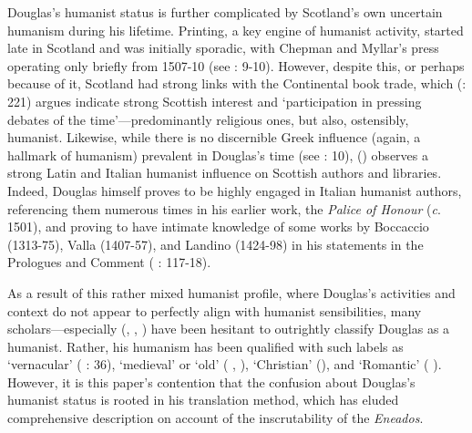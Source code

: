 \documentclass{dhbenelux}
\begin{document}
Douglas's humanist status is further complicated by Scotland's own
uncertain humanism during his lifetime. Printing, a key engine of
humanist activity, started late in Scotland and was initially 
sporadic, with Chepman and Myllar's press operating only briefly from 
1507-10 (see \citeauthor{dickson1885} \citeyear{dickson1885}: 9-10). 
However, despite this, or perhaps because of it, Scotland had strong 
links with the Continental book trade, which \citeauthor{ford1999} 
(\citeyear{ford1999}: 221) argues indicate strong Scottish interest 
and `participation in pressing debates of the time'---predominantly 
religious ones, but also, ostensibly, humanist. Likewise, while there 
is no discernible Greek influence (again, a hallmark of humanism) 
prevalent in Douglas's time (see \citeauthor{macqueen1990} 
\citeyear{macqueen1990}: 10), \citeauthor{jack1972} 
(\citeyear{jack1972}) observes a strong Latin and Italian humanist 
influence on Scottish authors and libraries. Indeed, Douglas himself 
proves to be highly engaged in Italian humanist authors, referencing 
them numerous times in his earlier work, the \emph{Palice of Honour} 
(\emph{c}. 1501), and proving to have intimate knowledge of some
works by Boccaccio (1313-75), Valla (1407-57), and Landino (1424-98) 
in his statements in the Prologues and Comment 
(\citeauthor{bawcutt1977} \citeyear{bawcutt1977}: 117-18).

As a result of this rather mixed humanist profile, where Douglas's
activities and context do not appear to perfectly align with humanist
sensibilities, many scholars---especially \citeauthor{gray1989} 
(\citeyear{gray1989}, \citeyear{gray2001}, \citeyear{gray2012}) have
been hesitant to outrightly classify Douglas as a humanist. Rather, 
his humanism has been qualified with such labels as `vernacular' 
(\citeauthor{bawcutt1976} \citeyear{bawcutt1976}: 36), `medieval' or 
`old' (\citeauthor{gray1989} \citeyear{gray1989}, 
\citeyear{gray2001}), `Christian' (\citeyear{gray2012}), and 
`Romantic' (\citeauthor{fowler2005} \citeyear{fowler2005}). However, 
it is this paper's contention that the confusion about Douglas's 
humanist status is rooted in his translation method, which has 
eluded comprehensive description on account of the inscrutability 
of the \emph{Eneados}.
\end{document}
